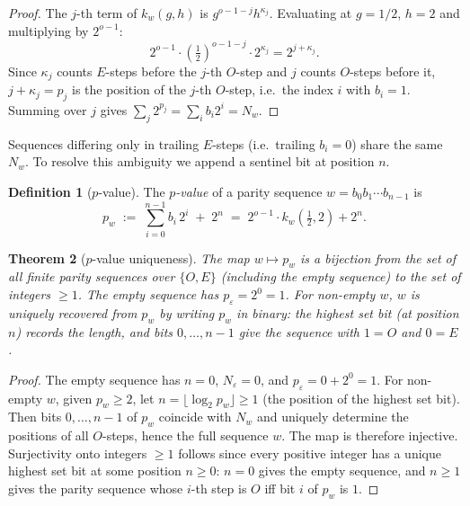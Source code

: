 \documentclass[12pt]{article}
\newtheorem{theorem}{Theorem}[section]
\theoremstyle{definition}
\newtheorem{definition}[theorem]{Definition}
\theoremstyle{remark}
\newcommand{\kpoly}{k}
\begin{document}
\begin{proof}
The $j$-th term of $\kpoly_w(g,h)$ is $g^{o-1-j} h^{\kappa_j}$.  Evaluating
at $g = 1/2$, $h = 2$ and multiplying by $2^{o-1}$:
\[
  2^{o-1} \cdot \left(\tfrac{1}{2}\right)^{o-1-j} \cdot 2^{\kappa_j}
  = 2^{j + \kappa_j}.
\]
Since $\kappa_j$ counts $E$-steps before the $j$-th $O$-step and $j$ counts
$O$-steps before it, $j + \kappa_j = p_j$ is the position of the $j$-th
$O$-step, i.e.\ the index $i$ with $b_i = 1$.  Summing over $j$ gives
$\sum_j 2^{p_j} = \sum_i b_i 2^i = N_w$.
\end{proof}

Sequences differing only in trailing $E$-steps (i.e.\ trailing $b_i = 0$)
share the same $N_w$.  To resolve this ambiguity we append a sentinel bit
at position $n$.

\begin{definition}[$p$-value]
\label{def:pvalue}
The \emph{$p$-value} of a parity sequence $w = b_0 b_1 \cdots b_{n-1}$ is
\[
  p_w \;:=\; \sum_{i=0}^{n-1} b_i\, 2^i \;+\; 2^n
  \;=\; 2^{o-1}\cdot\kpoly_w\!\left(\tfrac{1}{2},2\right) + 2^n.
\]
\end{definition}

\begin{theorem}[$p$-value uniqueness]
\label{thm:pvalue}
The map $w \mapsto p_w$ is a bijection from the set of all finite parity
sequences over $\{O,E\}$ (including the empty sequence) to the set of
integers $\geq 1$.  The empty sequence has $p_\varepsilon = 2^0 = 1$.
For non-empty $w$, $w$ is uniquely recovered from $p_w$ by writing $p_w$
in binary: the highest set bit (at position $n$) records the length, and
bits $0, \ldots, n-1$ give the sequence with $1 = O$ and $0 = E$.
\end{theorem}

\begin{proof}
The empty sequence has $n = 0$, $N_\varepsilon = 0$, and $p_\varepsilon = 0 + 2^0 = 1$.
For non-empty $w$, given $p_w \geq 2$, let $n = \lfloor \log_2 p_w \rfloor \geq 1$
(the position of the highest set bit).  Then bits $0, \ldots, n-1$ of $p_w$
coincide with $N_w$ and uniquely determine the positions of all $O$-steps,
hence the full sequence $w$.  The map is therefore injective.  Surjectivity
onto integers $\geq 1$ follows since every positive integer has a unique
highest set bit at some position $n \geq 0$: $n = 0$ gives the empty
sequence, and $n \geq 1$ gives the parity sequence whose $i$-th step is $O$
iff bit $i$ of $p_w$ is $1$.
\end{proof}
\end{document}
